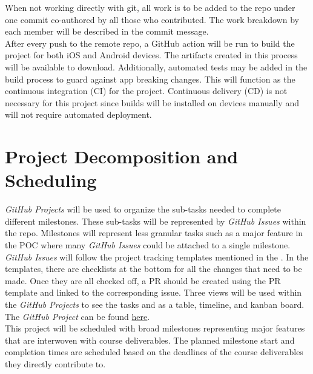 \documentclass{article}
\begin{document}
When not working directly with git, all work is to be added to the repo under one commit co-authored by all those who contributed. The work breakdown by each member will be described in the commit message. \\

After every push to the remote repo, a GitHub action will be run to build the project for both iOS and Android devices. The artifacts created in this process will be available to download. Additionally, automated tests may be added in the build process to guard against app breaking changes. This will function as the continuous integration (CI) for the project. Continuous delivery (CD) is not necessary for this project since builds will be installed on devices manually and will not require automated deployment. 

\section{Project Decomposition and Scheduling}

\textit{GitHub Projects} will be used to organize the sub-tasks needed to complete different milestones. These sub-tasks will be represented by \textit{GitHub Issues} within the repo. Milestones will represent less granular tasks such as a major feature in the POC where many \textit{GitHub Issues} could be attached to a single milestone. \textit{GitHub Issues} will follow the project tracking templates mentioned in the . In the templates, there are checklists at the bottom for all the changes that need to be made. Once they are all checked off, a PR should be created using the PR template and linked to the corresponding issue. Three views will be used within the \textit{GitHub Projects} to see the tasks and as a table, timeline, and kanban board. \\

The \textit{GitHub Project} can be found \href{ https://github.com/users/russellrd/projects/2}{here}. \\

This project will be scheduled with broad milestones representing major features that are interwoven with course deliverables. The planned milestone start and completion times are scheduled based on the deadlines of the course deliverables they directly contribute to. \\

\end{document}
